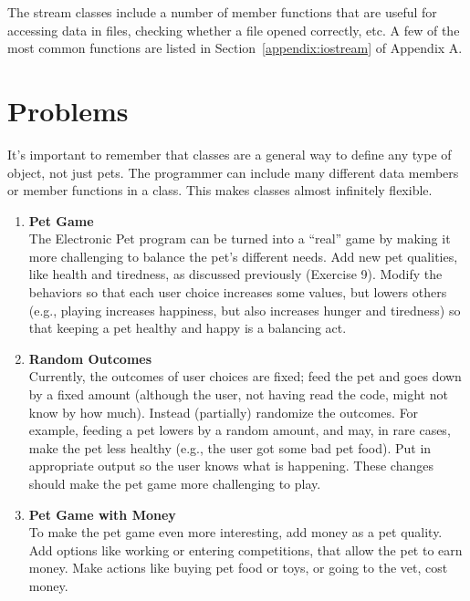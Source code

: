 The stream classes include a number of member functions that are useful for accessing data in files, checking whether a file opened correctly, etc.  A few of the most common functions are listed in Section~\ref{appendix:iostream} of Appendix A.

\section{Problems}
It's important to remember that classes are a general way to define any type of object, not just pets.  The programmer can include many different data members or member functions in a class.  This makes classes almost infinitely flexible.  
\begin{enumerate}

\item {\bf Pet Game}\\
 The Electronic Pet program can be turned into a ``real'' game by making it more challenging to balance the pet's different needs.  Add new pet qualities, like health and tiredness, as discussed previously (Exercise 9).  Modify the behaviors so that each user choice increases some values, but lowers others (e.g., playing increases happiness, but also increases hunger and tiredness) so that keeping a pet healthy and happy is a balancing act.

\item {\bf Random Outcomes}\\ 
Currently, the outcomes of user choices are fixed; feed the pet and  goes down by a fixed amount (although the user, not having read the code, might not know by how much).  Instead (partially) randomize the outcomes.  For example, feeding a pet lowers  by a random amount, and may, in rare cases, make the pet less healthy (e.g., the user got some bad pet food).  Put in appropriate output so the user knows what is happening.  These changes should make the pet game more challenging to play.

\item {\bf Pet Game with Money}\\
To make the pet game even more interesting, add money as a pet quality.  Add options like working or entering competitions, that allow the pet to earn money.  Make actions like buying pet food or toys, or going to the vet, cost money.  


\end{enumerate}
